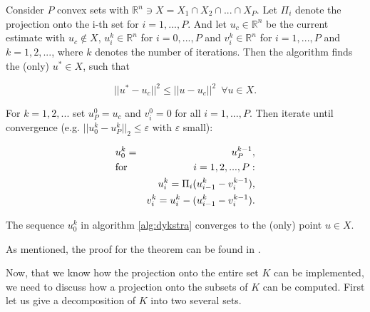         \begin{algorithm}
        \label{alg:dykstra}
            Consider $P$ convex sets with $\mathbb{R}^{n} \ni X = X_{1} \cap X_{2} \cap ... \cap X_{P}$. Let $\Pi_{i}$ denote the projection onto the i-th set for $i = 1, ..., P$. And let $u_{c} \in \mathbb{R}^{n}$ be the current estimate with $u_{c} \notin X$, $u_{i}^{k} \in \mathbb{R}^{n}$ for $i = 0, ..., P$ and $v_{i}^{k} \in \mathbb{R}^{n}$ for $i = 1, ..., P$ and $k = 1, 2, ...$, where $k$ denotes the number of iterations. Then the algorithm finds the (only) $u^{\ast} \in X$, such that

            $$
                ||u^{\ast} - u_{c}||^{2} \le ||u - u_{c}||^{2} \,\,\, \forall u \in X.
            $$

            For $k = 1, 2, ...$ set $u^{0}_{P} = u_{c}$ and $v^{0}_{i} = 0$ for all $i = 1, ..., P$. Then iterate until convergence (e.g. $||u_{0}^{k} - u_{P}^{k}||_{2} \le \varepsilon$ with $\varepsilon$ small):

            \begin{eqnarray}
                &u_{0}^{k} = &u_{P}^{k-1}, \notag \\
                &\textnormal{for} \,\, &i = 1, 2, ..., P: \notag \\
                &&u_{i}^{k} = \Pi_{i}(u_{i-1}^{k} - v_{i}^{k-1}), \notag \\
                &&v_{i}^{k} = u_{i}^{k} - (u_{i-1}^{k} - v_{i}^{k-1}). \notag
            \end{eqnarray}
        \end{algorithm}

        \begin{theorem}[Convergence]
            The sequence $u_{0}^{k}$ in algorithm \ref{alg:dykstra} converges to the (only) point $u \in X$.
        \end{theorem}
        As mentioned, the proof for the theorem can be found in \cite{dykstra-et-al-aors14}.


        Now, that we know how the projection onto the entire set $K$ can be implemented, we need to discuss how a projection onto the subsets of $K$ can be computed. First let us give a decomposition of $K$ into two several sets.

